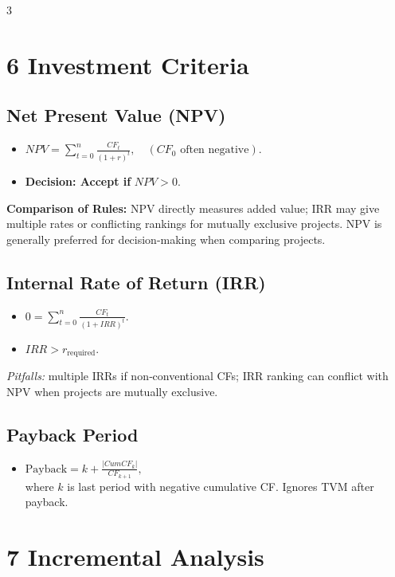 \documentclass[10pt,landscape,fleqn]{article}
\begin{document}
\begin{multicols}{3}
\section*{6 Investment Criteria}

\subsection*{Net Present Value (NPV)}
\begin{itemize}
  \item $NPV = \sum_{t=0}^n \frac{CF_t}{(1+r)^t}, \quad (CF_0 \text{ often negative}).$
  \item \textbf{Decision: Accept if }$NPV > 0.$
\end{itemize}
\textbf{Comparison of Rules:} NPV directly measures added value; IRR may give multiple rates or conflicting rankings for mutually exclusive projects. NPV is generally preferred for decision-making when comparing projects.

\subsection*{Internal Rate of Return (IRR)}
\begin{itemize}
  \item $0 = \sum_{t=0}^n \frac{CF_t}{(1 + IRR)^t}.$
  \item {}$IRR > r_{\mathrm{required}}.$
\end{itemize}
\emph{Pitfalls:} multiple IRRs if non‐conventional CFs; IRR ranking can conflict with NPV when projects are mutually exclusive.

\subsection*{Payback Period}
\begin{itemize}
  \item $\text{Payback} = k + \frac{|CumCF_k|}{CF_{k+1}},$ \\
    where $k$ is last period with negative cumulative CF. Ignores TVM after payback.
\end{itemize}

\section*{7 Incremental Analysis}


\end{multicols}
\end{document}
